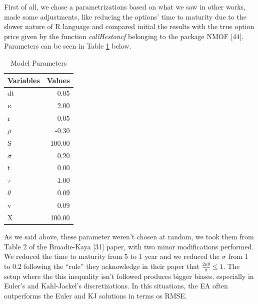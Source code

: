 \documentclass[12pt,twoside]{reedthesis}
\theoremstyle{definition}
\theoremstyle{definition}
\theoremstyle{remark}
\begin{document}
  First of all, we chose a parametrizations based on what we saw in other
  works, made some adjustments, like reducing the options' time to
  maturity due to the slower nature of R language and compared initial the
  results with the true option price given by the function
  \emph{callHestoncf} belonging to the package NMOF {[}44{]}. Parameters
  can be seen in Table \ref{param} below.
  \begin{table}[ht]
  \centering
  \begingroup\fontsize{9pt}{11pt}\selectfont
  \begin{tabular}{lr}
    \hline 
  Variables & Values \\ 
    \hline 
  dt & 0.05 \\ 
    $\kappa$ & 2.00 \\ 
    r & 0.05 \\ 
    $\rho$ & -0.30 \\ 
    S & 100.00 \\ 
    $\sigma$ & 0.20 \\ 
    t & 0.00 \\ 
    $\tau$ & 1.00 \\ 
    $\theta$ & 0.09 \\ 
    v & 0.09 \\ 
    X & 100.00 \\ 
     \hline 
  \end{tabular}
  \endgroup
  \caption{Model Parameters} 
  \label{param}
  \end{table}
  As we said above, these parameter weren't chosen at random, we took them
  from Table 2 of the Broadie-Kaya {[}31{]} paper, with two minor
  modifications performed. We reduced the time to maturity from 5 to 1
  year and we reduced the \(\sigma\) from 1 to 0.2 following the ``rule''
  they acknowledge in their paper that
  \(\frac{2 \kappa \theta}{\sigma} \leq 1\). The setup where the this
  inequality isn't followed produces bigger biases, especially in Euler's
  and Kahl-Jackel's discretizations. In this situations, the EA often
  outperforms the Euler and KJ solutions in terms os RMSE.
  
\end{document}
